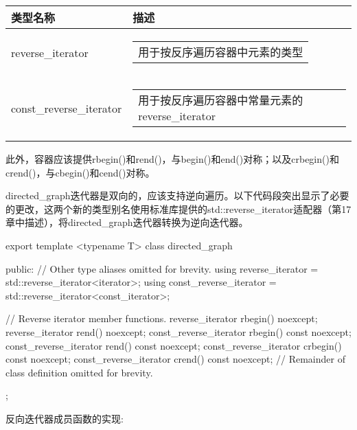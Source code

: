 \begin{longtable}{|l|l|}
\hline
\textbf{类型名称}       & \textbf{描述}                                                                                                                           \\ \hline
\endfirsthead
%
\endhead
%
reverse\_iterator        & \begin{tabular}[c]{@{}l@{}}用于按反序遍历容器中元素的类型\end{tabular}                             \\ \hline
const\_reverse\_iterator & \begin{tabular}[c]{@{}l@{}}用于按反序遍历容器中常量元素的reverse\_iterator\end{tabular} \\ \hline
\end{longtable}

此外，容器应该提供rbegin()和rend()，与begin()和end()对称；以及crbegin()和crend()，与cbegin()和cend()对称。

directed\_graph迭代器是双向的，应该支持逆向遍历。以下代码段突出显示了必要的更改，这两个新的类型别名使用标准库提供的std::reverse\_iterator适配器（第17章中描述），将directed\_graph迭代器转换为逆向迭代器。

\begin{cpp}
export template <typename T>
class directed_graph
{
    public:
    // Other type aliases omitted for brevity.
    using reverse_iterator = std::reverse_iterator<iterator>;
    using const_reverse_iterator = std::reverse_iterator<const_iterator>;

    // Reverse iterator member functions.
    reverse_iterator rbegin() noexcept;
    reverse_iterator rend() noexcept;
    const_reverse_iterator rbegin() const noexcept;
    const_reverse_iterator rend() const noexcept;
    const_reverse_iterator crbegin() const noexcept;
    const_reverse_iterator crend() const noexcept;
    // Remainder of class definition omitted for brevity.
};
\end{cpp}

反向迭代器成员函数的实现:

